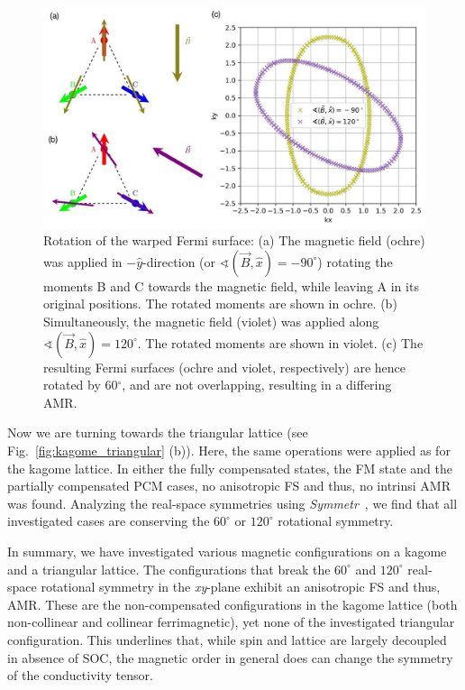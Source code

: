 \documentclass[prb,showpacs,amsmath,amssymb,superscriptaddress,twocolumn,floatfix]{revtex4-1}
\begin{document}
\begin{figure}
	\centering
	\includegraphics[width=1\linewidth]{img/FS-rotation}
	\caption{Rotation of the warped Fermi surface: 
		(a) The magnetic field (ochre) was applied in $-\hat{y}$-direction (or $\sphericalangle (\vec{B}, \hat{x}) = -90^\circ$) rotating the moments B and C towards the magnetic field, while leaving A in its original positions. The rotated moments are shown in ochre. (b) Simultaneously, the magnetic field (violet) was applied along $\sphericalangle (\vec{B}, \hat{x}) = 120^\circ$. The rotated moments are shown in violet. (c) The resulting Fermi surfaces (ochre and violet, respectively) are hence rotated by 60$^\circ$, and are not overlapping, resulting in a differing AMR.}
	\label{fig:fs-rotation}
\end{figure}

Now we are turning towards the triangular lattice (see Fig.~\ref{fig:kagome_triangular} (b)). Here, the same operations were applied as for the kagome lattice. In either the fully compensated states, the FM state and the partially compensated PCM cases, no anisotropic FS and thus, no intrinsi AMR was found. Analyzing the real-space symmetries using \textit{Symmetr}~\cite{Symmetr}, we find that all investigated cases are conserving the $60^\circ$ or $120^\circ$ rotational symmetry. 

In summary, we have investigated various magnetic configurations on a kagome and a triangular lattice. The configurations that break the $60^\circ$ and $120^\circ$ real-space rotational symmetry in the \textit{xy}-plane exhibit an anisotropic FS and thus, AMR. These are the non-compensated configurations in the kagome lattice (both non-collinear and collinear ferrimagnetic), yet none of the investigated triangular configuration. This underlines that, while spin and lattice are largely decoupled~\cite{Gonzalez-Hernandez:2024} in absence of SOC, the magnetic order in general does can change the symmetry of the conductivity tensor.
\end{document}
